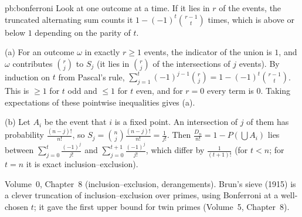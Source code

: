\begin{solution}{pb:bonferroni}
\idea Look at one outcome at a time. If it lies in $r$ of the events, the truncated alternating sum counts it $1-(-1)^t\binom{r-1}t$ times,
which is above or below $1$ depending on the parity of $t$.

\writeup (a) For an outcome $\omega$ in exactly $r\ge1$ events, the indicator of the union is $1$, and $\omega$ contributes $\binom rj$ to $S_j$ (it lies in
$\binom rj$ of the intersections of $j$ events). By induction on $t$ from Pascal's rule,
$\sum_{j=1}^t(-1)^{j-1}\binom rj=1-(-1)^t\binom{r-1}t$. This is $\ge1$ for $t$ odd and $\le1$ for $t$ even, and for $r=0$ every term is $0$.
Taking expectations of these pointwise inequalities gives (a).

(b) Let $A_i$ be the event that $i$ is a fixed point. An intersection of $j$ of them has probability $\frac{(n-j)!}{n!}$, so $S_j=\binom nj\frac{(n-j)!}{n!}=\frac1{j!}$.
Then $\frac{D_n}{n!}=1-P(\bigcup A_i)$ lies between $\sum_{j=0}^t\frac{(-1)^j}{j!}$ and $\sum_{j=0}^{t+1}\frac{(-1)^j}{j!}$, which differ by $\frac1{(t+1)!}$ (for $t<n$;
for $t=n$ it is exact inclusion--exclusion).

\tools Volume~0, Chapter~8 (inclusion--exclusion, derangements).
\leads Brun's sieve (1915) is a clever truncation of inclusion--exclusion over primes, using Bonferroni at a well-chosen $t$; it gave
the first upper bound for twin primes (Volume~5, Chapter~8).
\end{solution}

